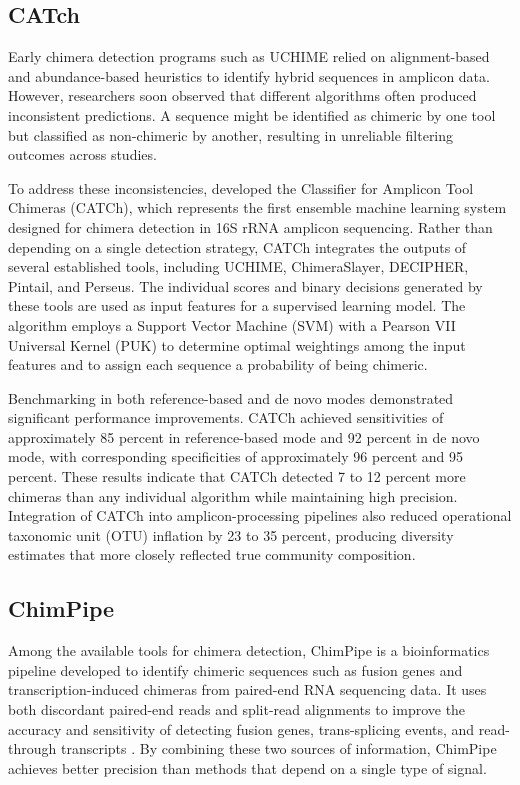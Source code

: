 \subsection{CATch}
Early chimera detection programs such as UCHIME \citep{Edgar2011} relied on alignment-based and abundance-based heuristics to identify hybrid sequences in amplicon data. However, researchers soon observed that different algorithms often produced inconsistent predictions. A sequence might be identified as chimeric by one tool but classified as non-chimeric by another, resulting in unreliable filtering outcomes across studies.

To address these inconsistencies, \citep{Mysara2015} developed the Classifier for Amplicon Tool Chimeras (CATCh), which represents the first ensemble machine learning system designed for chimera detection in 16S rRNA amplicon sequencing. Rather than depending on a single detection strategy, CATCh integrates the outputs of several established tools, including UCHIME, ChimeraSlayer, DECIPHER, Pintail, and Perseus. The individual scores and binary decisions generated by these tools are used as input features for a supervised learning model. The algorithm employs a Support Vector Machine (SVM) with a Pearson VII Universal Kernel (PUK) to determine optimal weightings among the input features and to assign each sequence a probability of being chimeric.

Benchmarking in both reference-based and de novo modes demonstrated significant performance improvements. CATCh achieved sensitivities of approximately 85 percent in reference-based mode and 92 percent in de novo mode, with corresponding specificities of approximately 96 percent and 95 percent. These results indicate that CATCh detected 7 to 12 percent more chimeras than any individual algorithm while maintaining high precision. Integration of CATCh into amplicon-processing pipelines also reduced operational taxonomic unit (OTU) inflation by 23 to 35 percent, producing diversity estimates that more closely reflected true community composition.

\subsection{ChimPipe}
Among the available tools for chimera detection, ChimPipe is a bioinformatics pipeline developed to identify chimeric sequences such as fusion genes and transcription-induced chimeras from paired-end RNA sequencing data. It uses both discordant paired-end reads and split-read alignments to improve the accuracy and sensitivity of detecting fusion genes, trans-splicing events, and read-through transcripts \citep{Rodriguez2017}. By combining these two sources of information, ChimPipe achieves better precision than methods that depend on a single type of signal.

